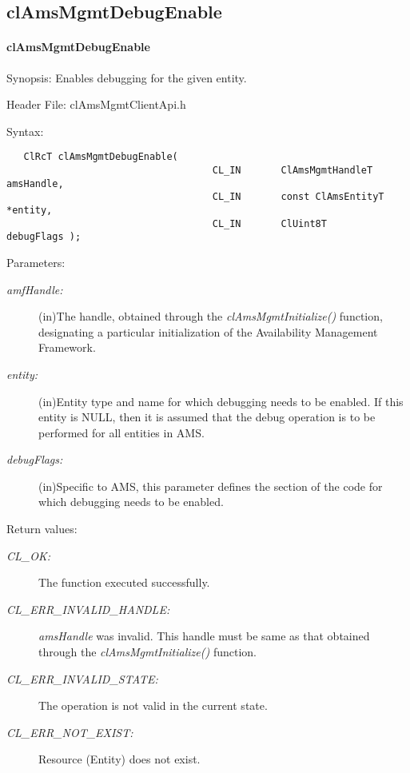 \subsection{clAmsMgmtDebugEnable}
\hypertarget{pageams125}{}\paragraph{cl\-Ams\-Mgmt\-Debug\-Enable}\label{pageams125}
\begin{Desc}
\item[Synopsis:]Enables debugging for the given entity.\end{Desc}
\begin{Desc}
\item[Header File:]clAmsMgmtClientApi.h\end{Desc}
\begin{Desc}
\item[Syntax:]

\footnotesize\begin{verbatim}   ClRcT clAmsMgmtDebugEnable(
                                	CL_IN       ClAmsMgmtHandleT            amsHandle,
                                	CL_IN       const ClAmsEntityT          *entity,
                                	CL_IN       ClUint8T                    debugFlags );
\end{verbatim}
\normalsize
\end{Desc}
\begin{Desc}
\item[Parameters:]
\begin{description}
\item[{\em amf\-Handle:}](in)The handle, obtained through the \textit{clAmsMgmtInitialize()} function, designating a particular initialization of 
the Availability Management Framework. \item[{\em entity:}](in)Entity type and name for which debugging needs to be enabled. If this entity is NULL, 
then it is assumed that the debug operation is to be performed for all entities in AMS. \item[{\em debug\-Flags:}](in)Specific to AMS, this parameter defines the section of the code for which debugging needs to be enabled.\end{description}
\end{Desc}
\begin{Desc}
\item[Return values:]
\begin{description}
\item[{\em CL\_\-OK:}]The function executed successfully. \item[{\em CL\_\-ERR\_\-INVALID\_\-HANDLE:}]{\em ams\-Handle\/} was invalid. 
This handle must be same as that obtained through the \textit{clAmsMgmtInitialize()} function. \item[{\em CL\_\-ERR\_\-INVALID\_\-STATE:}]The operation is not valid in the current state. \item[{\em CL\_\-ERR\_\-NOT\_\-EXIST:}]Resource (Entity) does not exist.\end{description}
\end{Desc}
